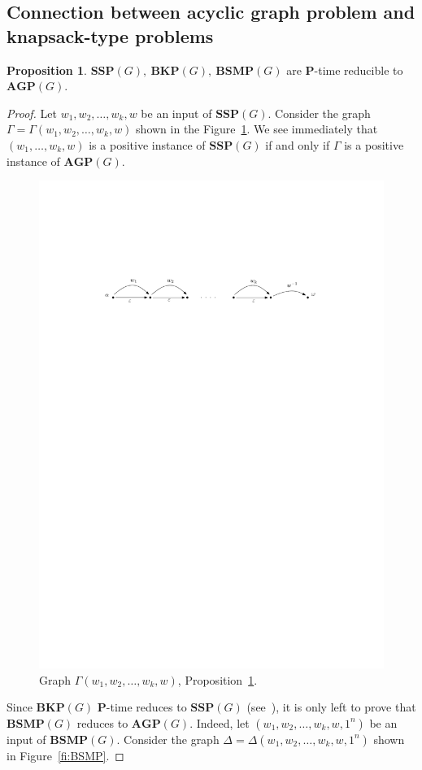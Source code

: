 \documentclass[10pt]{amsart}
\theoremstyle{definition}
\newtheorem{proposition}[theorem]{Proposition}
\def\P{{\mathbf{P}}}
\def\SSP{{\mathbf{SSP}}}
\def\BSMP{{\mathbf{BSMP}}}
\def\BKP{{\mathbf{BKP}}}
\def\AGP{{\mathbf{AGP}}}
\begin{document}
\subsection{Connection between acyclic graph problem and knapsack-type problems}
\begin{proposition}\label{pr:reduction_to_agp}
$\SSP(G),\ \BKP(G),\ \BSMP(G)$ are $\P$-time reducible to $\AGP(G)$.
\end{proposition}
\begin{proof} Let $w_1,w_2,\ldots, w_k, w$ be an input of $\SSP(G)$. Consider the graph $\Gamma=\Gamma(w_1,w_2,\ldots,w_k,w)$ shown in the Figure~\ref{fi:SSP}. We see immediately that $(w_1,\ldots,w_k,w)$ is a positive instance of $\SSP(G)$ if and only if $\Gamma$ is a positive instance of $\AGP(G)$.
\begin{figure}[h]
 \centering
 \includegraphics[width=4.5in]{ssp}
 \caption{Graph $\Gamma(w_1,w_2,\ldots,w_k,w)$, Proposition~\ref{pr:reduction_to_agp}.}\label{fi:SSP}
\end{figure}
Since $\BKP(G)$ $\P$-time reduces to $\SSP(G)$ (see~\cite{Miasnikov-Nikolaev-Ushakov:2014a}), it is only left to prove that $\BSMP(G)$ reduces to $\AGP(G)$. Indeed, let $(w_1,w_2,\ldots,w_k,w,1^n)$ be an input of $\BSMP(G)$. Consider the graph $\Delta=\Delta(w_1,w_2,\ldots,w_k,w,1^n)$ shown in Figure~\ref{fi:BSMP}.

\end{proof}
\end{document}

